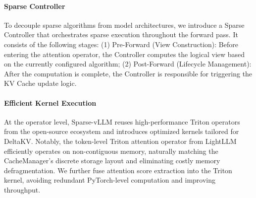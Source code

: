 \paragraph{Sparse Controller} 
To decouple sparse algorithms from model architectures, we introduce a Sparse Controller that orchestrates sparse execution throughout the forward pass. 
It consists of the following stages: (1) Pre-Forward (View Construction): Before entering the attention operator, the Controller computes the logical view based on the currently configured algorithm; (2) Post-Forward (Lifecycle Management): After the computation is complete, the Controller is responsible for triggering the KV Cache update logic.

\paragraph{Efficient Kernel Execution} 
At the operator level, Sparse-vLLM reuses high-performance Triton operators from the open-source ecosystem and introduces optimized kernels tailored for DeltaKV. 
Notably, the token-level Triton attention operator from LightLLM~\cite{lightllm2} efficiently operates on non-contiguous memory, naturally matching the CacheManager's discrete storage layout and eliminating costly memory defragmentation.
We further fuse attention score extraction into the Triton kernel, avoiding redundant PyTorch-level computation and improving throughput.

